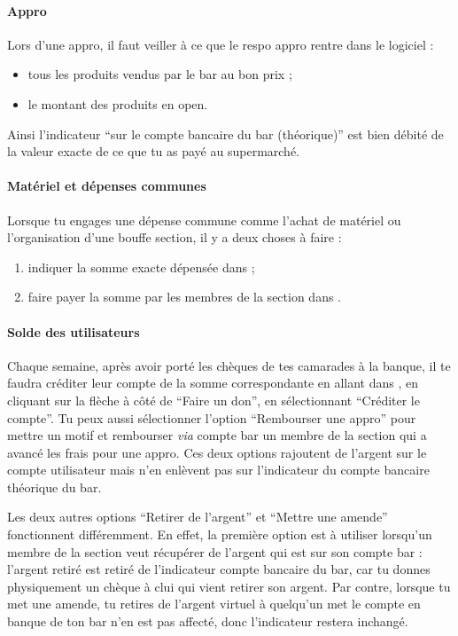 \documentclass[12pt,french]{article}
\begin{document}
\paragraph{Appro} Lors d'une appro, il faut veiller à ce que le respo appro rentre dans le logiciel :
\begin{itemize}
	\item tous les produits vendus par le bar au bon prix ;
	\item le montant des produits en open.
\end{itemize}
Ainsi l'indicateur \enquote{sur le compte bancaire du bar (théorique)}  est bien débité de la valeur exacte de ce que tu as payé au supermarché.

\paragraph{Matériel et dépenses communes} Lorsque tu engages une dépense commune comme l'achat de matériel ou l'organisation d'une bouffe section, il y a deux choses à faire :
\begin{enumerate}
	\item indiquer la somme exacte dépensée dans  ;%
	\item faire payer la somme par les membres de la section dans .
\end{enumerate}

\paragraph{Solde des utilisateurs} Chaque semaine, après avoir porté les chèques de tes camarades à la banque, il te faudra créditer leur compte de la somme correspondante en allant dans , en cliquant sur la flèche à côté de \enquote{Faire un don}, en sélectionnant \enquote{Créditer le compte}. Tu peux aussi sélectionner l'option \enquote{Rembourser une appro} pour mettre un motif et rembourser \emph{via} compte bar un membre de la section qui a avancé les frais pour une appro. Ces deux options rajoutent de l'argent sur le compte utilisateur mais n'en enlèvent pas sur l'indicateur du compte bancaire théorique du bar.

Les deux autres options \enquote{Retirer de l'argent} et \enquote{Mettre une amende} fonctionnent différemment. En effet, la première option est à utiliser lorsqu'un membre de la section veut récupérer de l'argent qui est sur son compte bar : l'argent retiré est retiré de l'indicateur compte bancaire du bar, car tu donnes physiquement un chèque à clui qui vient retirer son argent. Par contre, lorsque tu met une amende, tu retires de l'argent virtuel à quelqu'un met le compte en banque de ton bar n'en est pas affecté, donc l'indicateur restera inchangé.
\end{document}
